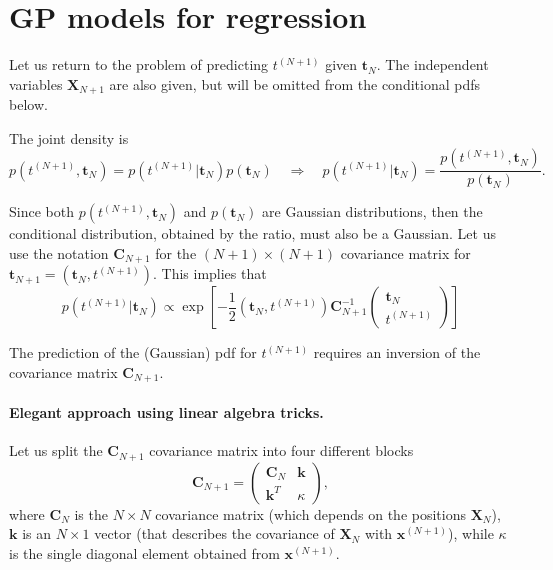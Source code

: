 \documentclass[%
oneside,                 %
final,                   %
10pt]{article}
\newenvironment{summary_mdfboxadmon}[1][]{
\begin{summary_mdfboxmdframed}[frametitle=#1]
}
{
\end{summary_mdfboxmdframed}
}
\begin{document}
\section{GP models for regression}
Let us return to the problem of predicting $t^{(N+1)}$ given $\boldsymbol{t}_N$. The independent variables $\boldsymbol{X}_{N+1}$ are also given, but will be omitted from the conditional pdfs below.

The joint density is
\[
p \left( t^{(N+1)}, \boldsymbol{t}_N \right) = p \left( t^{(N+1)} | \boldsymbol{t}_N \right) p \left( \boldsymbol{t}_N \right) 
\quad \Rightarrow \quad
p \left( t^{(N+1)} | \boldsymbol{t}_N \right) = \frac{p \left( t^{(N+1)}, \boldsymbol{t}_N \right)}{p \left( \boldsymbol{t}_N \right) }.
\]

Since both $p \left( t^{(N+1)}, \boldsymbol{t}_N \right)$ and $p \left( \boldsymbol{t}_N \right)$ are Gaussian distributions, then the conditional distribution, obtained by the ratio, must also be a Gaussian. Let us use the notation $\boldsymbol{C}_{N+1}$ for the $(N+1) \times (N+1)$ covariance matrix for $\boldsymbol{t}_{N+1} = \left( \boldsymbol{t}_N, t^{(N+1)} \right)$. This implies that
\[
p \left( t^{(N+1)} | \boldsymbol{t}_N \right) \propto \exp \left[ -\frac{1}{2} \left( \boldsymbol{t}_N, t^{(N+1)} \right) \boldsymbol{C}_{N+1}^{-1} 
\begin{pmatrix}
\boldsymbol{t}_N \\
t^{(N+1)}
\end{pmatrix}
\right]
\]


\begin{summary_mdfboxadmon}[Summary]
The prediction of the (Gaussian) pdf for $t^{(N+1)}$ requires an inversion of the covariance matrix $\boldsymbol{C}_{N+1}$.
\end{summary_mdfboxadmon} %



\paragraph{Elegant approach using linear algebra tricks.}
Let us split the $\boldsymbol{C}_{N+1}$ covariance matrix into four different blocks
\[
\boldsymbol{C}_{N+1} =
\begin{pmatrix}
\boldsymbol{C}_N & \boldsymbol{k} \\
\boldsymbol{k}^T & \kappa
\end{pmatrix},
\]
where $\boldsymbol{C}_N$ is the $N \times N$ covariance matrix (which depends on the positions $\boldsymbol{X}_N$), $\boldsymbol{k}$ is an $N \times 1$ vector (that describes the covariance of $\boldsymbol{X}_N$ with $\boldsymbol{x}^{(N+1)}$), while $\kappa$ is the single diagonal element obtained from $\boldsymbol{x}^{(N+1)}$.
\end{document}
